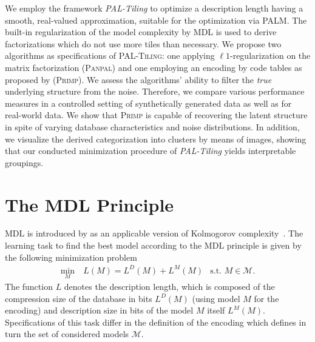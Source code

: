 We employ the framework \emph{PAL-Tiling} to optimize a description length having a smooth, real-valued approximation, suitable for the optimization via PALM. The built-in regularization of the model complexity by MDL is used to derive factorizations which do not use more tiles than necessary. We propose two algorithms as specifications of \textsc{PAL-Tiling}: one applying $\ell 1$-regularization on the matrix factorization (\textsc{Panpal}) and one employing an encoding by code tables as proposed by \cite{siebes2006item} (\textsc{Primp}). 
We assess the algorithms' ability to filter the \textit{true} underlying structure from the noise. Therefore, we compare various performance measures in a controlled setting of synthetically generated data as well as for real-world data. We show that \textsc{Primp} is capable of recovering the latent structure in spite of varying database characteristics and noise distributions. In addition, we visualize the derived categorization into clusters by means of images, showing that our conducted minimization procedure of \textit{PAL-Tiling} yields interpretable groupings. 
\section{The MDL Principle}
MDL is introduced by \cite{rissanen1978modeling} as an applicable version of Kolmogorov complexity~\citep{li2008introduction,grunwald2007minimum}.
The learning task to find the best model according to the MDL principle is given by the following minimization problem 
\begin{align*}
    	\min_M&\ L(M) = L^D(M) + L^M(M) &\text{s.t. } M\in\mathcal{M}.
\end{align*} 
The function $L$ denotes the description length, which is composed of the compression size of the database in bits $L^D(M)$ (using model $M$ for the encoding) and description size in bits of the model $M$ itself $L^M(M)$.
Specifications of this task differ in the definition of the encoding which defines in turn the set of considered models $\mathcal{M}$. 
